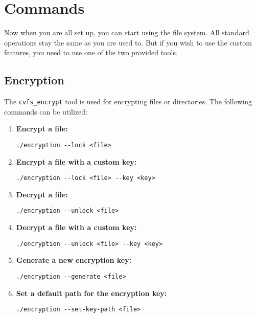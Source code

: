 \section*{Commands}

Now when you are all set up, you can start using the file system.
All standard operations stay the same as you are used to.
But if you wish to use the custom features, you need to use one of the two provided tools.

\subsection*{Encryption}

The \texttt{cvfs\_encrypt} tool is used for encrypting files or directories.
The following commands can be utilized:

\begin{enumerate}
    \setlength\itemsep{-0.1em}
    \item \textbf{Encrypt a file:} \\
    \begin{BVerbatim}[baseline=t,boxwidth=10cm]
  ./encryption --lock <file>
    \end{BVerbatim}

    \item \textbf{Encrypt a file with a custom key:} \\
    \begin{BVerbatim}[baseline=t,boxwidth=10cm]
  ./encryption --lock <file> --key <key>
    \end{BVerbatim}

    \item \textbf{Decrypt a file:} \\
    \begin{BVerbatim}[baseline=t,boxwidth=10cm]
  ./encryption --unlock <file>
    \end{BVerbatim}

    \item \textbf{Decrypt a file with a custom key:} \\
    \begin{BVerbatim}[baseline=t,boxwidth=10cm]
  ./encryption --unlock <file> --key <key>
    \end{BVerbatim}

    \item \textbf{Generate a new encryption key:} \\
    \begin{BVerbatim}[baseline=t,boxwidth=10cm]
  ./encryption --generate <file>
    \end{BVerbatim}

    \item \textbf{Set a default path for the encryption key:} \\
    \begin{BVerbatim}[baseline=t,boxwidth=10cm]
  ./encryption --set-key-path <file>
    \end{BVerbatim}
\end{enumerate}

